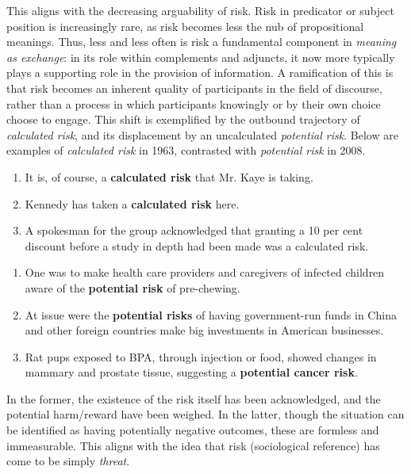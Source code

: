 
This aligns with the decreasing arguability of risk. Risk in predicator or subject position is increasingly rare, as risk becomes less the nub of propositional meanings. Thus, less and less often is risk a fundamental component in \emph{meaning as exchange}: in its role within complements and adjuncts, it now more typically plays a supporting role in the provision of information. A ramification of this is that risk becomes an inherent quality of participants in the field of discourse, rather than a process in which participants knowingly or by their own choice choose to engage. This shift is exemplified by the outbound trajectory of \emph{calculated risk}, and its displacement by an uncalculated \emph{potential risk}. Below are examples of \emph{calculated risk} in 1963, contrasted with \emph{potential risk} in 2008.

\begin{enumerate}   [before=\itshape,font=\normalfont] \setlength\itemsep{0em} \small
\item It is, of course, a \textbf{calculated risk} that Mr. Kaye is taking.
\item Kennedy has taken a \textbf{calculated risk} here.
\item A spokesman for the group acknowledged that granting a 10 per cent discount before a study in depth had been made was a calculated risk.
\end{enumerate}

\begin{enumerate}   [before=\itshape,font=\normalfont] \setlength \itemsep{0em} \small
\item One was to make health care providers and caregivers of infected children aware of the \textbf{potential risk} of pre-chewing.
\item At issue were the \textbf{potential risks} of having government-run funds in China and other foreign countries make big investments in American businesses.
\item Rat pups exposed to BPA, through injection or food, showed changes in mammary and prostate tissue, suggesting a \textbf{potential cancer risk}.
\end{enumerate}
%
In the former, the existence of the risk itself has been acknowledged, and the potential harm\slash reward have been weighed. In the latter, though the situation can be identified as having potentially negative outcomes, these are formless and immeasurable. This aligns with the idea that risk (sociological reference) has come to be simply \emph{threat}.

